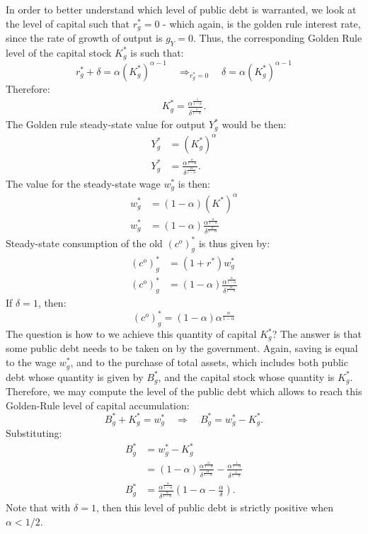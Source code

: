 \documentclass[]{book}
\begin{document}
In order to better understand which level of public debt is warranted,
we look at the level of capital such that \(r^{*}_g=0\) - which again,
is the golden rule interest rate, since the rate of growth of output is
\(g_Y=0\). Thus, the corresponding Golden Rule level of the capital
stock \(K^{*}_g\) is such that:
\[r^{*}_g+\delta=\alpha (K^{*}_g)^{\alpha-1} \quad \Rightarrow_{r^{*}_g=0} \quad \delta=\alpha (K^{*}_g)^{\alpha-1}\]
Therefore: \[
\begin{aligned}
K^{*}_g=\frac{\alpha^{\frac{1}{1-\alpha}}}{\delta^{\frac{1}{1-\alpha}}}.
\end{aligned}
\] The Golden rule steady-state value for output \(Y^{*}_g\) would be
then: \[
\begin{aligned}
Y^{*}_g&=\left(K^{*}_g\right)^{\alpha}\\
Y^{*}_g&=\frac{\alpha^{\frac{\alpha}{1-\alpha}}}{\delta^{\frac{\alpha}{1-\alpha}}}.
\end{aligned}
\] The value for the steady-state wage \(w^{*}_g\) is then: \[
\begin{aligned}
w^{*}_g&=(1-\alpha)\left(K^{*}\right)^{\alpha}\\
w^{*}_g&=(1-\alpha) \frac{\alpha^{\frac{\alpha}{1-\alpha}}}{\delta^{\frac{\alpha}{1-\alpha}}}
\end{aligned}
\] Steady-state consumption of the old \((c^{o})^{*}_g\) is thus given
by: \[
\begin{aligned}
(c^{o})^{*}_g&=(1+r^*)w^{*}_g\\
(c^{o})^{*}_g&=(1-\alpha) \frac{\alpha^{\frac{\alpha}{1-\alpha}}}{\delta^{\frac{\alpha}{1-\alpha}}}
\end{aligned}
\] If \(\delta = 1\), then:
\[(c^{o})^{*}_g=(1-\alpha) \alpha^{\frac{\alpha}{1-\alpha}}\] The
question is how to we achieve this quantity of capital \(K^{*}_g\)? The
answer is that some public debt needs to be taken on by the government.
Again, saving is equal to the wage \(w^{*}_g\), and to the purchase of
total assets, which includes both public debt whose quantity is given by
\(B^{*}_g\), and the capital stock whose quantity is \(K^{*}_g\).
Therefore, we may compute the level of the public debt which allows to
reach this Golden-Rule level of capital accumulation:
\[B^{*}_g+K^{*}_g=w^{*}_g\quad\Rightarrow\quad B^{*}_g=w^{*}_g-K^{*}_g.\]
Substituting: \[
\begin{aligned}
B^{*}_g&=w^{*}_g-K^{*}_g\\
&=(1-\alpha) \frac{\alpha^{\frac{\alpha}{1-\alpha}}}{\delta^{\frac{\alpha}{1-\alpha}}}-\frac{\alpha^{\frac{1}{1-\alpha}}}{\delta^{\frac{1}{1-\alpha}}}\\
B^{*}_g&=\frac{\alpha^{\frac{\alpha}{1-\alpha}}}{\delta^{\frac{\alpha}{1-\alpha}}}\left(1-\alpha-\frac{\alpha}{\delta}\right).
\end{aligned}
\] Note that with \(\delta = 1\), then this level of public debt is
strictly positive when \(\alpha <1/2\).
\end{document}
